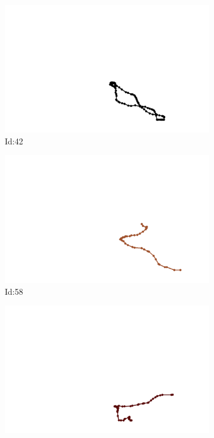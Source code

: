 \documentclass[12pt,twoside]{report}
\begin{document}
\begin{figure}
\centering
\begin{subfigure}[b]{0.20\textwidth}
\centering
\includegraphics[width=\textwidth]{../trajectories/42.png}
\caption{Id:42}
\end{subfigure}
\begin{subfigure}[b]{0.20\textwidth}
\centering
\includegraphics[width=\textwidth]{../trajectories/58.png}
\caption{Id:58}
\end{subfigure}
\begin{subfigure}[b]{0.20\textwidth}
\centering
\includegraphics[width=\textwidth]{../trajectories/110.png}

\end{subfigure}
\end{figure}
\end{document}
